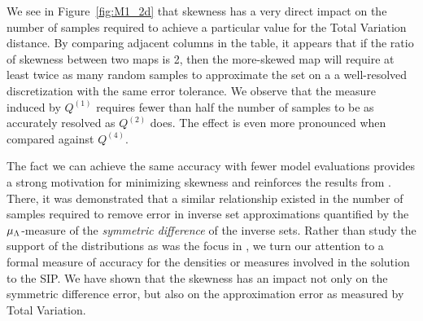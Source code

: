 We see in Figure~\ref{fig:M1_2d} that skewness has a very direct impact on the number of samples required to achieve a particular value for the Total Variation distance.
By comparing adjacent columns in the table, it appears that if the ratio of skewness between two maps is 2, then the more-skewed map will require at least twice as many random samples to approximate the set on a a well-resolved discretization with the same error tolerance.
We observe that the measure induced by $Q^{(1)}$ requires fewer than half the number of samples to be as accurately resolved as $Q^{(2)}$ does.
The effect is even more pronounced when compared against $Q^{(4)}$.

The fact we can achieve the same accuracy with fewer model evaluations provides a strong motivation for minimizing skewness and reinforces the results from \cite{BPW_2015}.
There, it was demonstrated that a similar relationship existed in the number of samples required to remove error in inverse set approximations quantified by the $\mu_{\Lambda}$-measure of the {\em symmetric difference} of the inverse sets.
Rather than study the support of the distributions as was the focus in \cite{BPW_2015}, we turn our attention to a formal measure of accuracy for the densities or measures involved in the solution to the SIP.
We have shown that the skewness has an impact not only on the symmetric difference error, but also on the approximation error as measured by Total Variation.
